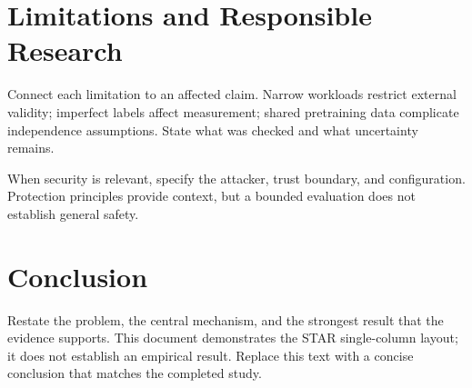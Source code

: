 \section{Limitations and Responsible Research}
Connect each limitation to an affected claim. Narrow workloads restrict
external validity; imperfect labels affect measurement; shared pretraining
data complicate independence assumptions. State what was checked and
what uncertainty remains.

When security is relevant, specify the attacker, trust boundary, and
configuration. Protection principles \citep{saltzer1975} provide context,
but a bounded evaluation does not establish general safety.

\section{Conclusion}
Restate the problem, the central mechanism, and the strongest result that
the evidence supports. This document demonstrates the STAR single-column
layout; it does not establish an empirical result. Replace this text with
a concise conclusion that matches the completed study.

